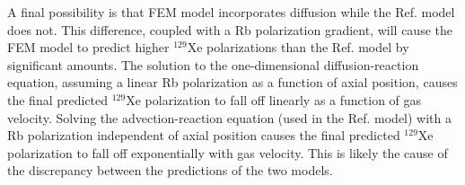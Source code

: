 A final possibility is that FEM model incorporates diffusion while the Ref. \cite{Freeman2014} model does not. This difference, coupled with a Rb polarization gradient, will cause the FEM model to predict higher $^{129}$Xe polarizations than the Ref. \cite{Freeman2014} model by significant amounts. The solution to the one-dimensional diffusion-reaction equation, assuming a linear Rb polarization as a function of axial position, causes the final predicted $^{129}$Xe polarization to fall off linearly as a function of gas velocity. Solving the advection-reaction equation (used in the Ref. \cite{Freeman2014} model) with a Rb polarization independent of axial position causes the final predicted $^{129}$Xe polarization to fall off exponentially with gas velocity. This is likely the cause of the discrepancy between the predictions of the two models. 